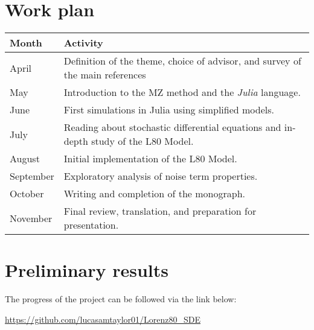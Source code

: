 \documentclass[12pt]{article}
\begin{document}
\section*{Work plan}
\begin{center}
	\renewcommand{\arraystretch}{1.5}
	\begin{tabular}{p{3cm}p{10cm}}
		\toprule
		\textbf{Month} & \textbf{Activity}                                                                    \\
		\midrule
		April          & Definition of the theme, choice of advisor, and survey of the main references        \\
		May            & Introduction to the MZ method and the \textit{Julia} language.                       \\
		June           & First simulations in Julia using simplified models.                                  \\
		July           & Reading about stochastic differential equations and in-depth study of the L80 Model. \\ 
		August         & Initial implementation of the L80 Model.                                             \\
		September      & Exploratory analysis of noise term properties.                                       \\
		October        & Writing and completion of the monograph.                                             \\
		November       & Final review, translation, and preparation for presentation.                         \\
		\bottomrule
	\end{tabular}
\end{center}

\section*{Preliminary results}
The progress of the project can be followed via the link below:

\href{https://github.com/lucasamtaylor01/Lorenz80_SDE}{https://github.com/lucasamtaylor01/Lorenz80\_SDE}


\newpage
\nocite{*}
\printbibliography[title={References}, label={sec:bib}]
\end{document}
